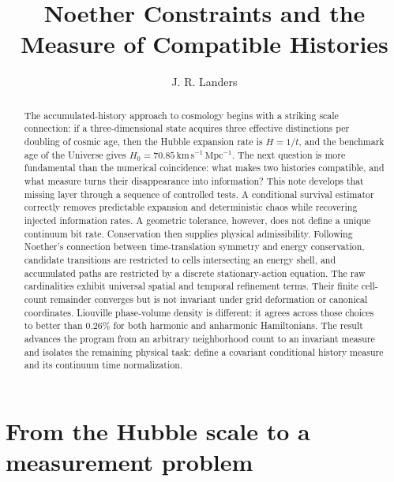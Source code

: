 \documentclass[10pt]{article}
\title{\vspace{-2.3em}\textbf{Noether Constraints and the Measure of Compatible Histories}}
\author{J. R. Landers}
\date{}
\begin{document}
\maketitle
\vspace{-1.25em}

\begin{abstract}
The accumulated-history approach to cosmology begins with a striking scale
connection: if a three-dimensional state acquires three effective distinctions
per doubling of cosmic age, then the Hubble expansion rate is $H=1/t$, and the
benchmark age of the Universe gives
$H_0=70.85\,\mathrm{km\,s^{-1}\,Mpc^{-1}}$.  The next question is more
fundamental than the numerical coincidence: what makes two histories
compatible, and what measure turns their disappearance into information?
This note develops that missing layer through a sequence of controlled tests.
A conditional survival estimator correctly removes predictable expansion and
deterministic chaos while recovering injected information rates.  A geometric
tolerance, however, does not define a unique continuum bit rate.  Conservation
then supplies physical admissibility.  Following Noether's connection between
time-translation symmetry and energy conservation, candidate transitions are
restricted to cells intersecting an energy shell, and accumulated paths are
restricted by a discrete stationary-action equation.  The raw cardinalities
exhibit universal spatial and temporal refinement terms.  Their finite
cell-count remainder converges but is not invariant under grid deformation or
canonical coordinates.  Liouville phase-volume density is different: it agrees
across those choices to better than $0.26\%$ for both harmonic and anharmonic
Hamiltonians.  The result advances the program from an arbitrary neighborhood
count to an invariant measure and isolates the remaining physical task: define
a covariant conditional history measure and its continuum time normalization.
\end{abstract}

\section*{From the Hubble scale to a measurement problem}
\end{document}
